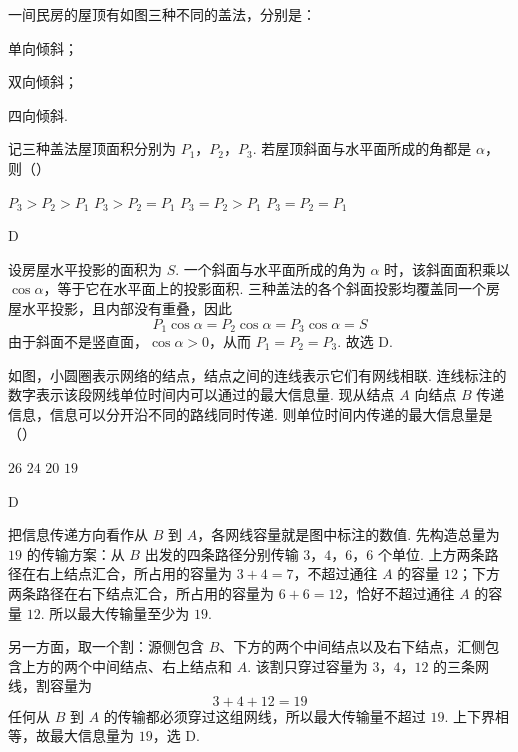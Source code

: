 \begin{problem}
一间民房的屋顶有如图三种不同的盖法，分别是：

\begin{circlelist}
\item 单向倾斜；
\item 双向倾斜；
\item 四向倾斜.
\end{circlelist}

记三种盖法屋顶面积分别为 \(P_1\)，\(P_2\)，\(P_3\). 若屋顶斜面与水平面所成的角都是 \(\alpha\)，则（\quad）

\begingroup
\leftskip=0pt\relax
\rightskip=0pt\relax
{}
\endgroup

\choices
    {\(P_3>P_2>P_1\)}
    {\(P_3>P_2=P_1\)}
    {\(P_3=P_2>P_1\)}
    {\(P_3=P_2=P_1\)}
\end{problem}

\begin{answer}
D
\end{answer}

\begin{solution}
设房屋水平投影的面积为 \(S\). 一个斜面与水平面所成的角为 \(\alpha\) 时，该斜面面积乘以 \(\cos\alpha\)，等于它在水平面上的投影面积. 三种盖法的各个斜面投影均覆盖同一个房屋水平投影，且内部没有重叠，因此
\[
P_1\cos\alpha=P_2\cos\alpha=P_3\cos\alpha=S
\]
由于斜面不是竖直面，\(\cos\alpha>0\)，从而 \(P_1=P_2=P_3\). 故选 D.
\end{solution}

\begin{problem}
如图，小圆圈表示网络的结点，结点之间的连线表示它们有网线相联. 连线标注的数字表示该段网线单位时间内可以通过的最大信息量. 现从结点 \(A\) 向结点 \(B\) 传递信息，信息可以分开沿不同的路线同时传递. 则单位时间内传递的最大信息量是（\quad）


\choices
    {\(26\)}
    {\(24\)}
    {\(20\)}
    {\(19\)}
\end{problem}

\begin{answer}
D
\end{answer}

\begin{solution}
把信息传递方向看作从 \(B\) 到 \(A\)，各网线容量就是图中标注的数值. 先构造总量为 \(19\) 的传输方案：从 \(B\) 出发的四条路径分别传输 \(3\)，\(4\)，\(6\)，\(6\) 个单位. 上方两条路径在右上结点汇合，所占用的容量为 \(3+4=7\)，不超过通往 \(A\) 的容量 \(12\)；下方两条路径在右下结点汇合，所占用的容量为 \(6+6=12\)，恰好不超过通往 \(A\) 的容量 \(12\). 所以最大传输量至少为 \(19\).

另一方面，取一个割：源侧包含 \(B\)、下方的两个中间结点以及右下结点，汇侧包含上方的两个中间结点、右上结点和 \(A\). 该割只穿过容量为 \(3\)，\(4\)，\(12\) 的三条网线，割容量为
\[
3+4+12=19
\]
任何从 \(B\) 到 \(A\) 的传输都必须穿过这组网线，所以最大传输量不超过 \(19\). 上下界相等，故最大信息量为 \(19\)，选 D.
\end{solution}

